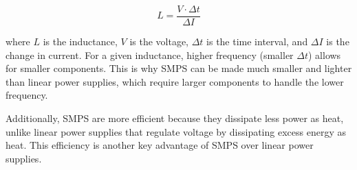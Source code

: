 \[
L = \frac{V \cdot \Delta t}{\Delta I}
\]

where \( L \) is the inductance, \( V \) is the voltage, \( \Delta t \) is the time interval, and \( \Delta I \) is the change in current. For a given inductance, higher frequency (smaller \( \Delta t \)) allows for smaller components. This is why SMPS can be made much smaller and lighter than linear power supplies, which require larger components to handle the lower frequency.

Additionally, SMPS are more efficient because they dissipate less power as heat, unlike linear power supplies that regulate voltage by dissipating excess energy as heat. This efficiency is another key advantage of SMPS over linear power supplies.

